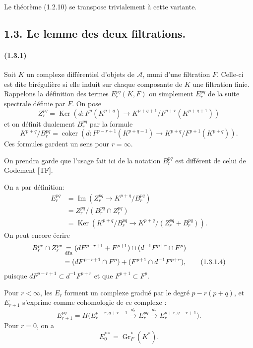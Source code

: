 \documentclass[10pt]{article}
\newcommand{\Gr}{\operatorname{Gr}}
\newcommand{\Ker}{\operatorname{Ker}}
\newcommand{\Imop}{\operatorname{Im}}
\newcommand{\coker}{\operatorname{coker}}
\newcommand{\calA}{\mathcal A}
\begin{document}
Le théorème (1.2.10) se transpose trivialement à cette variante.

\subsection*{1.3. Le lemme des deux filtrations.}

\paragraph{(1.3.1)} Soit $K$ un complexe différentiel d'objets de $\calA$, muni d'une filtration $F$. Celle-ci est dite birégulière si elle induit sur chaque composante de $K$ une filtration finie. Rappelons la définition des termes $E_r^{pq}(K,F)$ ou simplement $E_r^{pq}$ de la suite spectrale définie par $F$. On pose
\[
Z_r^{pq}=\Ker\left(d:F^p(K^{p+q})\to K^{p+q+1}/F^{p+r}(K^{p+q+1})\right)
\]
et on définit dualement $B_r^{pq}$ par la formule
\[
K^{p+q}/B_r^{pq}=\coker\left(d:F^{p-r+1}(K^{p+q-1})\to K^{p+q}/F^{p+1}(K^{p+q})\right).
\]
Ces formules gardent un sens pour $r=\infty$.

On prendra garde que l'usage fait ici de la notation $B_r^{pq}$ est différent de celui de Godement [TF].

On a par définition:
\begin{align}
E_r^{pq}&=\Imop\left(Z_r^{pq}\to K^{p+q}/B_r^{pq}\right) \tag{1.3.1.1}\\
&=Z_r^{pq}/(B_r^{pq}\cap Z_r^{pq}) \tag{1.3.1.2}\\
&=\Ker\left(K^{p+q}/B_r^{pq}\to K^{p+q}/(Z_r^{pq}+B_r^{pq})\right). \tag{1.3.1.3}
\end{align}
On peut encore écrire
\begin{align}
B_r^{p*}\cap Z_r^{p*}
&\underset{\mathrm{dfn}}{=}(dF^{p-r+1}+F^{p+1})\cap(d^{-1}F^{p+r}\cap F^p) \notag\\
&=(dF^{p-r+1}\cap F^p)+(F^{p+1}\cap d^{-1}F^{p+r}), \tag{1.3.1.4}
\end{align}
puisque $dF^{p-r+1}\subset d^{-1}F^{p+r}$ et que $F^{p+1}\subset F^p$.


Pour $r<\infty$, les $E_r$ forment un complexe gradué par le degré $p-r(p+q)$, et $E_{r+1}$ s'exprime comme cohomologie de ce complexe :
\[
\tag{1.3.1.5}
E_{r+1}^{pq}=H\bigl(E_r^{p-r,q+r-1}\xrightarrow{d_r}E_r^{pq}\xrightarrow{d_r}E_r^{p+r,q-r+1}\bigr).
\]
Pour $r=0$, on a
\[
\tag{1.3.1.6}
E_0^{**}=\Gr_F^*(K^*).
\]
\end{document}
